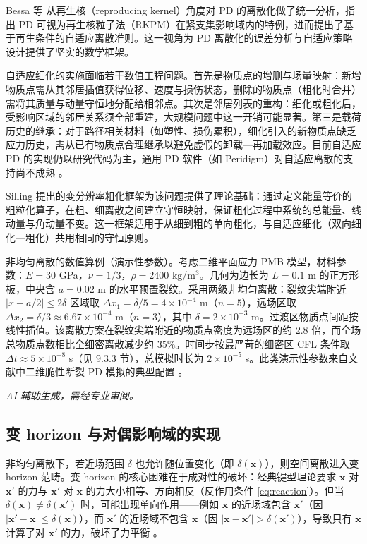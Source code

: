 Bessa 等 \cite{Bessa2014} 从再生核（reproducing kernel）角度对 PD 的离散化做了统一分析，指出 PD 可视为再生核粒子法（RKPM）在紧支集影响域内的特例，进而提出了基于再生条件的自适应离散准则。这一视角为 PD 离散化的误差分析与自适应策略设计提供了坚实的数学框架。

自适应细化的实施面临若干数值工程问题。首先是物质点的增删与场量映射：新增物质点需从其邻居插值获得位移、速度与损伤状态，删除的物质点（粗化时合并）需将其质量与动量守恒地分配给相邻点。其次是邻居列表的重构：细化或粗化后，受影响区域的邻居关系须全部重建，大规模问题中这一开销可能显著。第三是载荷历史的继承：对于路径相关材料（如塑性、损伤累积），细化引入的新物质点缺乏应力历史，需从已有物质点合理继承以避免虚假的卸载—再加载效应。目前自适应 PD 的实现仍以研究代码为主，通用 PD 软件（如 Peridigm）对自适应离散的支持尚不成熟 \cite{Diehl2019}。

Silling \cite{Silling2011coarsening} 提出的变分辨率粗化框架为该问题提供了理论基础：通过定义能量等价的粗粒化算子，在粗、细离散之间建立守恒映射，保证粗化过程中系统的总能量、线动量与角动量不变。这一框架适用于从细到粗的单向粗化，与自适应细化（双向细化—粗化）共用相同的守恒原则。

非均匀离散的数值算例（演示性参数）。考虑二维平面应力 PMB 模型，材料参数：$E=30$ GPa，$\nu=1/3$，$\rho=2400$ kg/m$^3$。几何为边长为 $L=0.1$ m 的正方形板，中央含 $a=0.02$ m 的水平预置裂纹。采用两级非均匀离散：裂纹尖端附近 $|x-a/2|\le 2\delta$ 区域取 $\Delta x_1=\delta/5=4\times10^{-4}$ m（$n=5$），远场区取 $\Delta x_2=\delta/3\approx6.67\times10^{-4}$ m（$n=3$），其中 $\delta=2\times10^{-3}$ m。过渡区物质点间距按线性插值。该离散方案在裂纹尖端附近的物质点密度为远场区的约 2.8 倍，而全场总物质点数相比全细密离散减少约 $35\%$。时间步按最严苛的细密区 CFL 条件取 $\Delta t\approx5\times10^{-8}$ s（见 9.3.3 节），总模拟时长为 $2\times10^{-5}$ s。此类演示性参数来自文献中二维脆性断裂 PD 模拟的典型配置 \cite{HaBobaru2010,Diehl2019}。

\emph{AI 辅助生成，需经专业审阅。}

\subsection{变 horizon 与对偶影响域的实现}\label{sec:disc-variable-horizon}

非均匀离散下，若近场范围 $\delta$ 也允许随位置变化（即 $\delta(\mathbf{x})$），则空间离散进入变 horizon 范畴。变 horizon 的核心困难在于成对性的破坏：经典键型理论要求 $\mathbf{x}$ 对 $\mathbf{x}'$ 的力与 $\mathbf{x}'$ 对 $\mathbf{x}$ 的力大小相等、方向相反（反作用条件 \eqref{eq:reaction}）。但当 $\delta(\mathbf{x})\neq\delta(\mathbf{x}')$ 时，可能出现单向作用——例如 $\mathbf{x}$ 的近场域包含 $\mathbf{x}'$（因 $|\mathbf{x}'-\mathbf{x}|\le\delta(\mathbf{x})$），而 $\mathbf{x}'$ 的近场域不包含 $\mathbf{x}$（因 $|\mathbf{x}-\mathbf{x}'|>\delta(\mathbf{x}')$），导致只有 $\mathbf{x}$ 计算了对 $\mathbf{x}'$ 的力，破坏了力平衡 \cite{Ren2017dualhorizon,Silling2011coarsening}。

